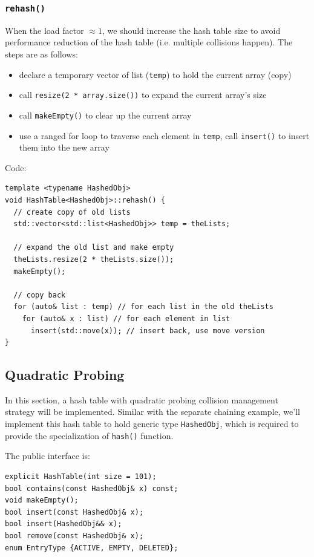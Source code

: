 \documentclass[12pt]{book}
\begin{document}
\subsubsection{\texttt{rehash()}}
\label{sec:orgb5da04a}
When the load factor \(\approx 1\), we should increase the hash table size to avoid performance reduction of the hash table (i.e. multiple collisions happen). The steps are as follows:
\begin{itemize}
\item declare a temporary vector of list (\texttt{temp}) to hold the current array (copy)
\item call \texttt{resize(2 * array.size())} to expand the current array's size
\item call \texttt{makeEmpty()} to clear up the current array
\item use a ranged for loop to traverse each element in \texttt{temp}, call \texttt{insert()} to insert them into the new array
\end{itemize}

Code:
\begin{verbatim}
template <typename HashedObj>
void HashTable<HashedObj>::rehash() {
  // create copy of old lists
  std::vector<std::list<HashedObj>> temp = theLists;

  // expand the old list and make empty
  theLists.resize(2 * theLists.size());
  makeEmpty();

  // copy back
  for (auto& list : temp) // for each list in the old theLists 
    for (auto& x : list) // for each element in list 
      insert(std::move(x)); // insert back, use move version
}
\end{verbatim}

\subsection{Quadratic Probing}
\label{sec:org4a219d0}
In this section, a hash table with quadratic probing collision management strategy will be implemented. Similar with the separate chaining example, we'll implement this hash table to hold generic type \texttt{HashedObj}, which is required to provide the specialization of \texttt{hash()} function.

The public interface is:
\begin{verbatim}
explicit HashTable(int size = 101);
bool contains(const HashedObj& x) const;
void makeEmpty();
bool insert(const HashedObj& x);
bool insert(HashedObj&& x);
bool remove(const HashedObj& x); 
enum EntryType {ACTIVE, EMPTY, DELETED};
\end{verbatim}
\end{document}
